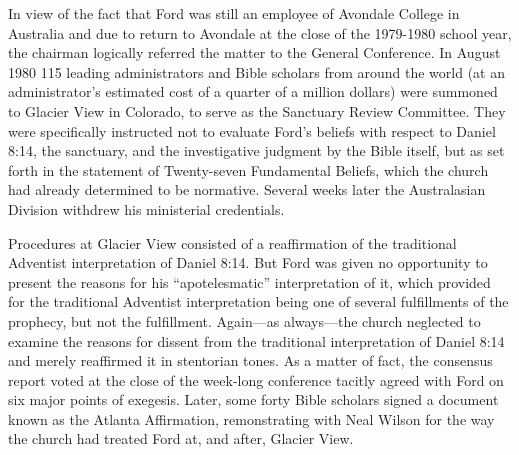 In view of the fact that Ford was still an employee of Avondale College in
Australia and due to return to Avondale at the close of the 1979-1980 school
year, the chairman logically referred the matter to the General Conference.
In August 1980 115 leading administrators and Bible scholars from around the
world (at an administrator's estimated cost of a quarter of a million
dollars) were summoned to Glacier View in Colorado, to serve as the
Sanctuary Review Committee. They were specifically instructed not to
evaluate Ford's beliefs with respect to Daniel 8:14, the sanctuary, and the
investigative judgment by the Bible itself, but as set forth in the
statement of Twenty-seven Fundamental Beliefs, which the church had already
determined to be normative. Several weeks later the Australasian Division
withdrew his ministerial credentials.

Procedures at Glacier View consisted of a reaffirmation of the traditional
Adventist interpretation of Daniel 8:14. But Ford was given no opportunity
to present the reasons for his ``apotelesmatic'' interpretation of it, which
provided for the traditional Adventist interpretation being one of several
fulfillments of the prophecy, but not the fulfillment. Again---as
always---the church neglected to examine the reasons for dissent from the
traditional interpretation of Daniel 8:14 and merely reaffirmed it in
stentorian tones. As a matter of fact, the consensus report voted at the
close of the week-long conference tacitly agreed with Ford on six major
points of exegesis. Later, some forty Bible scholars signed a document known
as the Atlanta Affirmation, remonstrating with Neal Wilson for the way the
church had treated Ford at, and after, Glacier View.

